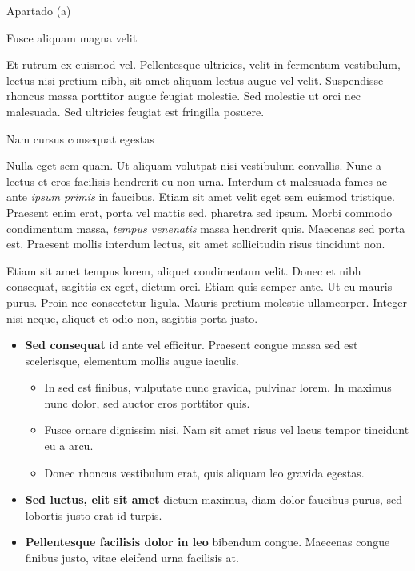 \documentclass[final]{beamer}
\newlength{\colwidth}
\begin{document}
\begin{frame}[t]
\begin{columns}[t]
\begin{column}{\colwidth}
\begin{block}{Apartado (a)}
  \end{block}

  \begin{block}{Fusce aliquam magna velit}

    Et rutrum ex euismod vel. Pellentesque ultricies, velit in fermentum
    vestibulum, lectus nisi pretium nibh, sit amet aliquam lectus augue vel
    velit. Suspendisse rhoncus massa porttitor augue feugiat molestie. Sed
    molestie ut orci nec malesuada. Sed ultricies feugiat est fringilla
    posuere.

  \end{block}

  \begin{block}{Nam cursus consequat egestas}

    Nulla eget sem quam. Ut aliquam volutpat nisi vestibulum convallis. Nunc a
    lectus et eros facilisis hendrerit eu non urna. Interdum et malesuada fames
    ac ante \textit{ipsum primis} in faucibus. Etiam sit amet velit eget sem
    euismod tristique. Praesent enim erat, porta vel mattis sed, pharetra sed
    ipsum. Morbi commodo condimentum massa, \textit{tempus venenatis} massa
    hendrerit quis. Maecenas sed porta est. Praesent mollis interdum lectus,
    sit amet sollicitudin risus tincidunt non.

    Etiam sit amet tempus lorem, aliquet condimentum velit. Donec et nibh
    consequat, sagittis ex eget, dictum orci. Etiam quis semper ante. Ut eu
    mauris purus. Proin nec consectetur ligula. Mauris pretium molestie
    ullamcorper. Integer nisi neque, aliquet et odio non, sagittis porta justo.

    \begin{itemize}
      \item \textbf{Sed consequat} id ante vel efficitur. Praesent congue massa
        sed est scelerisque, elementum mollis augue iaculis.
        \begin{itemize}
          \item In sed est finibus, vulputate
            nunc gravida, pulvinar lorem. In maximus nunc dolor, sed auctor eros
            porttitor quis.
          \item Fusce ornare dignissim nisi. Nam sit amet risus vel lacus
            tempor tincidunt eu a arcu.
          \item Donec rhoncus vestibulum erat, quis aliquam leo
            gravida egestas.
        \end{itemize}
      \item \textbf{Sed luctus, elit sit amet} dictum maximus, diam dolor
        faucibus purus, sed lobortis justo erat id turpis.
      \item \textbf{Pellentesque facilisis dolor in leo} bibendum congue.
        Maecenas congue finibus justo, vitae eleifend urna facilisis at.
    \end{itemize}


\end{block}
\end{column}
\end{columns}
\end{frame}
\end{document}

